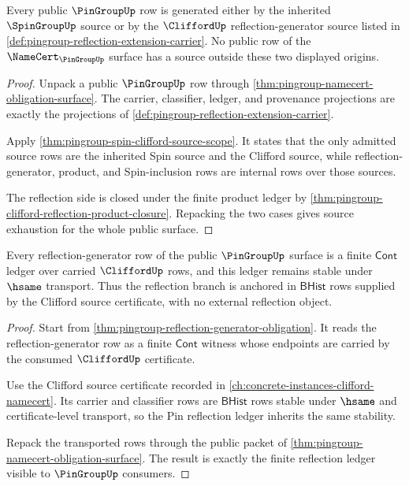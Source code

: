 \begin{theorem}
\label{thm:pingroup-source-exhaustion}
Every public $\PinGroupUp$ row is generated either by the inherited
$\SpinGroupUp$ source or by the $\CliffordUp$ reflection-generator source
listed in \autoref{def:pingroup-reflection-extension-carrier}. No public row
of the $\NameCert_{\PinGroupUp}$ surface has a source outside these two
displayed origins.
\end{theorem}
\begin{proof}
Unpack a public $\PinGroupUp$ row through
\autoref{thm:pingroup-namecert-obligation-surface}. The carrier, classifier,
ledger, and provenance projections are exactly the projections of
\autoref{def:pingroup-reflection-extension-carrier}.

Apply \autoref{thm:pingroup-spin-clifford-source-scope}. It states that the
only admitted source rows are the inherited Spin source and the Clifford
source, while reflection-generator, product, and Spin-inclusion rows are
internal rows over those sources.

The reflection side is closed under the finite product ledger by
\autoref{thm:pingroup-clifford-reflection-product-closure}. Repacking the two
cases gives source exhaustion for the whole public surface.
\end{proof}

\begin{theorem}
\label{thm:pingroup-reflection-ledger-closure}
Every reflection-generator row of the public $\PinGroupUp$ surface is a finite
$\mathsf{Cont}$ ledger over carried $\CliffordUp$ rows, and this ledger remains
stable under $\hsame$ transport. Thus the reflection branch is anchored in
$\mathsf{BHist}$ rows supplied by the Clifford source certificate, with no
external reflection object.
\end{theorem}
\begin{proof}
Start from \autoref{thm:pingroup-reflection-generator-obligation}. It reads the
reflection-generator row as a finite $\mathsf{Cont}$ witness whose endpoints
are carried by the consumed $\CliffordUp$ certificate.

Use the Clifford source certificate recorded in
\autoref{ch:concrete-instances-clifford-namecert}. Its carrier and classifier
rows are $\mathsf{BHist}$ rows stable under $\hsame$ and certificate-level
transport, so the Pin reflection ledger inherits the same stability.

Repack the transported rows through the public packet of
\autoref{thm:pingroup-namecert-obligation-surface}. The result is exactly the
finite reflection ledger visible to $\PinGroupUp$ consumers.
\end{proof}

